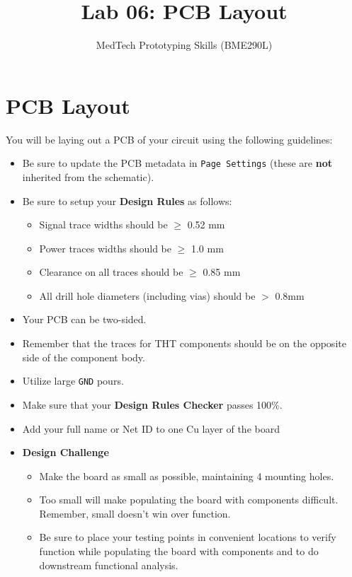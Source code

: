 \documentclass[10pt]{article}
\begin{document}
\title{Lab 06: PCB Layout} 
\author{MedTech Prototyping Skills (BME290L)}
\maketitle

\section{PCB Layout}
You will be laying out a PCB of your circuit using the following guidelines:
\begin{itemize}
    \item Be sure to update the PCB metadata in \texttt{Page Settings} (these are \textbf{not} inherited from the schematic).
    \item Be sure to setup your \textbf{Design Rules} as follows:
    \begin{itemize}
        \item Signal trace widths should be $\geq$ 0.52 mm
        \item Power traces widths should be $\geq$ 1.0 mm
        \item Clearance on all traces should be $\geq$ 0.85 mm
        \item All drill hole diameters (including vias) should be $>$ 0.8mm
    \end{itemize}
    \item Your PCB can be two-sided.
    \item Remember that the traces for THT components should be on the opposite side of the component body.
    \item Utilize large \texttt{GND} pours.
    \item Make sure that your \textbf{Design Rules Checker} passes 100\%.
    \item Add your full name or Net ID to one Cu layer of the board
    \item \textbf{Design Challenge}
    \begin{itemize}
        \item Make the board as small as possible, maintaining 4 mounting holes.
        \item Too small will make populating the board with components
            difficult.  Remember, small doesn't win over function.
        \item Be sure to place your testing points in convenient locations to
            verify function while populating the board with components and to
            do downstream functional analysis.
    \end{itemize}
\end{itemize}
\end{document}
